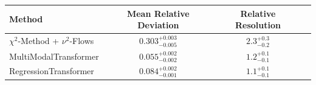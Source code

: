     \begin{tabular}{lccc}
        \toprule
        Method & Mean Relative Deviation & Relative Resolution \\
        \midrule
        $\chi^2$-Method + $\nu^2$-Flows & $0.303_{-0.005}^{+0.003}$ & $2.3_{-0.2}^{+0.3}$ \\
        MultiModalTransformer & $0.055_{-0.002}^{+0.002}$ & $1.2_{-0.1}^{+0.1}$ \\
        RegressionTransformer & $0.084_{-0.001}^{+0.002}$ & $1.1_{-0.1}^{+0.1}$ \\
        \bottomrule
    \end{tabular}